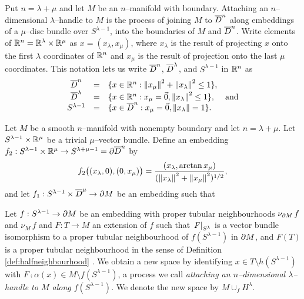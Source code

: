 Put $n=\lambda+\mu$ and let $M$ be an $n$--manifold with boundary.
Attaching an $n$--dimensional $\lambda$--handle to $M$ is the process of joining $M$ to $\overline{D}^n$ along embeddings of a $\mu$--disc bundle over $S^{\lambda-1}$, into the boundaries of $M$ and $\overline{D}^n$.
Write elements of $\mathbb{R}^n=\mathbb{R}^\lambda\times\mathbb{R}^\mu$ as $x=(x_\lambda,x_\mu)$, where $x_\lambda$ is the result of projecting $x$ onto the first $\lambda$ coordinates of $\mathbb{R}^n$ and $x_\mu$ is the result of projection onto the last $\mu$ coordinates.
This notation lets us write $\overline{D}^n$, $\overline{D}^\lambda$, and $S^{\lambda-1}$ in $\mathbb{R}^n$ as
\[
	\begin{array}{cclr}
		\overline{D}^n & = & \{x\in\mathbb{R}^n : \left\lVert x_\mu \right\rVert^2 + \left\lVert x_\lambda \right\rVert^2 \leq 1\}, & \\
		\overline{D}^\lambda & = & \{x\in\mathbb{R}^n : x_\mu=\vec{0}, \left\lVert x_\lambda \right\rVert^2 \leq 1\}, & \textrm{and} \\
		S^{\lambda-1} & = & \{x\in \overline{D}^n: x_\mu=\vec{0}, \left\lVert x_\lambda \right\rVert=1\}. &
	\end{array}
\]

\begin{defn}[Handle]
	Let $M$ be a smooth $n$--manifold with nonempty boundary and let $n=\lambda+\mu$.
	Let $S^{\lambda-1}\times \mathbb{R}^\mu$ be a trivial $\mu$--vector bundle.
	Define an embedding $f_2:S^{\lambda-1}\times\mathbb{R}^\mu\to S^{\lambda+\mu-1}=\partial\overline{D}^n$ by
	\[
		f_2\big((x_\lambda,0),(0,x_\mu)\big) = \frac{(x_\lambda,\arctan x_\mu)}{(\left\lVert x_\lambda \right\rVert^2+\left\lVert x_\mu \right\rVert^2)^{1/2}},
	\]
	and let $f_1:S^{\lambda-1}\times\overline{D}^\mu\to \partial M$ be an embedding such that 
	
	Let $f:S^{\lambda-1}\to \partial M$ be an embedding with proper tubular neighbourhoods $\nu_{\partial M}\,f$ and $\nu_M\,f$ and $F:T\to M$ an extension of $f$ such that $\left.F\right|_{S^\lambda}$ is a vector bundle isomorphism to a proper tubular neighbourhood of $f(S^{\lambda-1})$ in $\partial M$, and $F(T)$ is a proper tubular neighbourhood in the sense of Definition \ref{def:halfneighbourhood} .
	We obtain a new space by identifying $x\in T\setminus h(S^{\lambda-1})$ with $F\comp\alpha(x)\in M\setminus f(S^{\lambda-1})$, a process we call \emph{attaching an $n$--dimensional $\lambda$--handle to $M$ along $f(S^{\lambda-1})$}.
	We denote the new space by $M\cup_f H^\lambda$.	
\end{defn}

